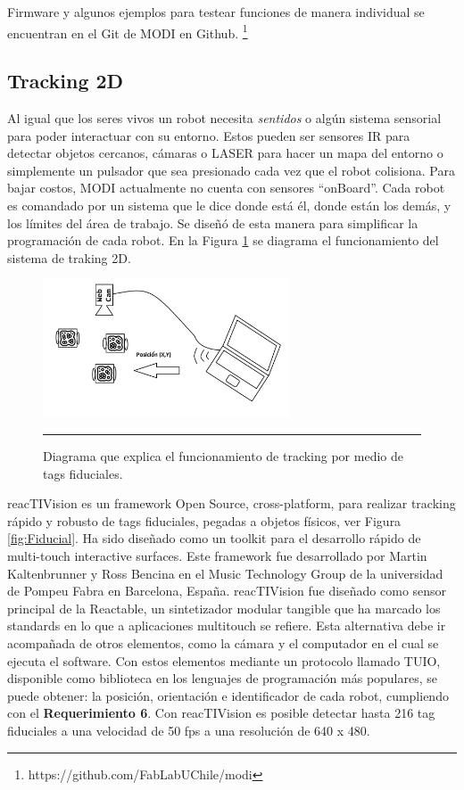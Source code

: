 Firmware y algunos ejemplos para testear funciones de manera individual se encuentran en el Git de MODI en Github. \footnote{https://github.com/FabLabUChile/modi}


\subsection{Tracking 2D}
Al igual que los seres vivos un robot necesita \textit{sentidos} o algún sistema sensorial para poder interactuar con su entorno. Estos pueden ser sensores IR para detectar objetos cercanos, cámaras o LASER para hacer un mapa del entorno o simplemente un pulsador que sea presionado cada vez que el robot colisiona. Para bajar costos, MODI actualmente no cuenta con sensores “onBoard”. Cada robot es comandado por un sistema que le dice donde está él, donde están los demás, y los límites del área de trabajo. Se diseñó de esta manera para simplificar la programación de cada robot. En la Figura \ref{fig:FidTracking} se diagrama el funcionamiento del sistema de traking 2D.


\begin{figure}[htbp]
	\centering
		\includegraphics[width=0.65\textwidth]{./Figures/MODI/fidPosicion.jpg}
		\rule{35em}{0.5pt}
	\caption[Diagrama Fiduciales]{Diagrama que explica el funcionamiento de tracking por medio de tags fiduciales.}
	\label{fig:FidTracking}
\end{figure}

reacTIVision \cite{kaltenbrunner2007reactivision} es un framework Open Source, cross-platform, para realizar tracking rápido y robusto de tags fiduciales, pegadas a objetos físicos, ver Figura \ref{fig:Fiducial}. Ha sido diseñado como un toolkit para el desarrollo rápido de multi-touch interactive surfaces. Este framework fue desarrollado por Martin Kaltenbrunner y Ross Bencina en el Music Technology Group de la universidad de Pompeu Fabra en Barcelona, España. reacTIVision fue diseñado como sensor principal de la Reactable, un sintetizador modular tangible que ha marcado los standards en lo que a aplicaciones multitouch se refiere. 
Esta alternativa debe ir acompañada de otros elementos, como la cámara y el computador en el cual se ejecuta el software. Con estos elementos mediante un protocolo llamado TUIO, disponible como biblioteca en los lenguajes de programación más populares, se puede obtener: la posición, orientación e identificador de cada robot, cumpliendo con el \textbf{Requerimiento 6}. Con reacTIVision es posible detectar hasta 216 tag fiduciales a una velocidad de 50 fps a una resolución de 640 x 480.




